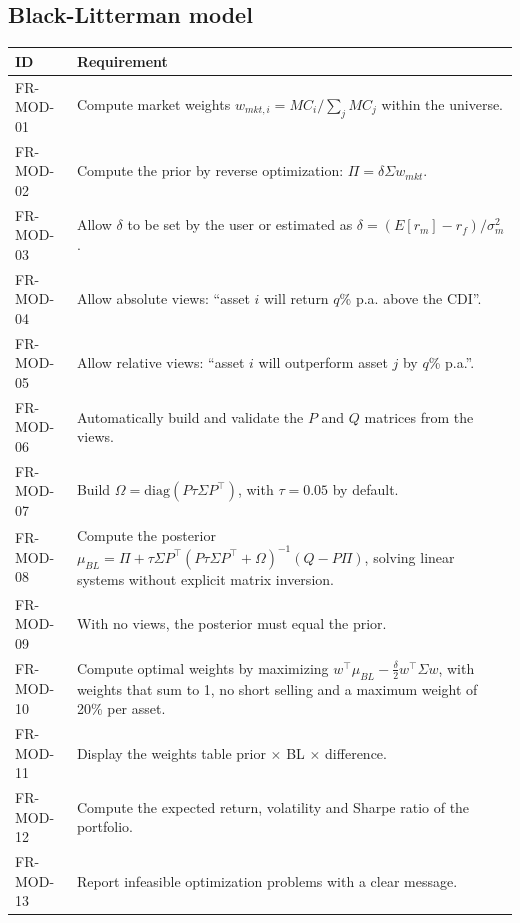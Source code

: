 \subsection{Black-Litterman model}
\begin{tabularx}{\textwidth}{@{}lX@{}}
\toprule
\textbf{ID} & \textbf{Requirement} \\ \midrule
FR-MOD-01 & Compute market weights $w_{mkt,i} = MC_i / \sum_j MC_j$ within the universe. \\
FR-MOD-02 & Compute the prior by reverse optimization: $\Pi = \delta \Sigma w_{mkt}$. \\
FR-MOD-03 & Allow $\delta$ to be set by the user or estimated as $\delta = (E[r_m]-r_f)/\sigma_m^2$. \\
FR-MOD-04 & Allow absolute views: ``asset $i$ will return $q$\% p.a. above the CDI''. \\
FR-MOD-05 & Allow relative views: ``asset $i$ will outperform asset $j$ by $q$\% p.a.''. \\
FR-MOD-06 & Automatically build and validate the $P$ and $Q$ matrices from the views. \\
FR-MOD-07 & Build $\Omega = \mathrm{diag}(P\tau\Sigma P^{\top})$, with $\tau = 0.05$ by default. \\
FR-MOD-08 & Compute the posterior $\mu_{BL} = \Pi + \tau\Sigma P^{\top}(P\tau\Sigma P^{\top} + \Omega)^{-1}(Q - P\Pi)$, solving linear systems without explicit matrix inversion. \\
FR-MOD-09 & With no views, the posterior must equal the prior. \\
FR-MOD-10 & Compute optimal weights by maximizing $w^{\top}\mu_{BL} - \frac{\delta}{2} w^{\top}\Sigma w$, with weights that sum to 1, no short selling and a maximum weight of 20\% per asset. \\
FR-MOD-11 & Display the weights table prior $\times$ BL $\times$ difference. \\
FR-MOD-12 & Compute the expected return, volatility and Sharpe ratio of the portfolio. \\
FR-MOD-13 & Report infeasible optimization problems with a clear message. \\
\bottomrule
\end{tabularx}

